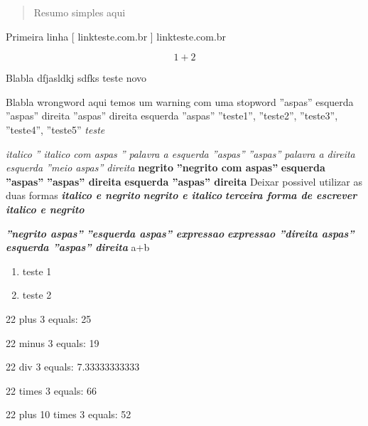 \documentclass[12pt]{article}
\begin{document}
 
\begin{abstract} 
Resumo simples aqui
\end{abstract}

Primeira linha 
[ linkteste.com.br ] {linkteste.com.br}

\begin{equation} 
1 + 2
\end{equation}

Blabla dfjasldkj sdfks
teste novo

Blabla
wrongword  aqui temos um warning com uma stopword
''aspas''
esquerda ''aspas'' direita
''aspas'' direita
esquerda ''aspas''
''teste1'', ''teste2'', ''teste3'', ''teste4'', ''teste5''\textit{ teste}

\textit{ italico}
\textit{'' italico com aspas ''}
\textit{palavra a esquerda ''aspas''}
\textit{''aspas'' palavra a direita}
\textit{esquerda ''meio aspas'' direita}
\textbf{ negrito }
\textbf{''negrito com aspas''}
\textbf{ esquerda ''aspas''}
\textbf{''aspas'' direita}
\textbf{ esquerda ''aspas'' direita}
Deixar possivel utilizar as duas formas
\textit{ \textbf{  italico e negrito }}
\textbf{ \textit{ negrito e italico} }
\textbf{\textit{ terceira forma de escrever italico e negrito }}

\textbf{\textit{''negrito aspas''}}
\textbf{\textit{''esquerda aspas'' expressao }}
\textbf{\textit{ expressao ''direita aspas''}}
\textbf{\textit{ esquerda ''aspas'' direita }}
a+b
\begin{enumerate} 
\item teste 1
\item teste 2
\end{enumerate}

22 plus 3 equals:
25

22 minus 3 equals:
19

22 div 3 equals:
7.33333333333

22 times 3 equals: 
66

22 plus 10 times 3 equals: 
52
\end{document}
